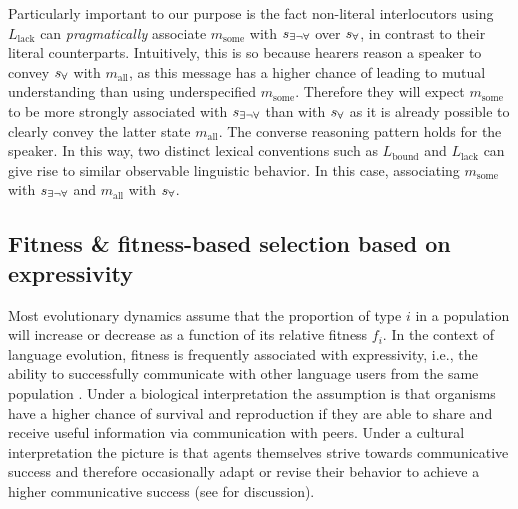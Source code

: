 \documentclass[a4paper, 11pt]{article}
\newcommand{\state}{\ensuremath{s}\xspace}		%
\newcommand{\mystate}[1]{\ensuremath{\state_{\text{#1}}}\xspace} %
\newcommand{\mylang}[1]{\ensuremath{L_{\text{#1}}}\xspace} %
\newcommand{\messg}{\ensuremath{m}\xspace}		%
\newcommand{\mymessg}[1]{\ensuremath{\messg_{\text{#1}}}\xspace} %
\newcommand{\ssome}{\mystate{\ensuremath{\exists\neg\forall}}}
\newcommand{\sall}{\mystate{\ensuremath{\forall}}}
\newcommand{\msome}{\mymessg{some}}
\newcommand{\mall}{\mymessg{all}}
\newcommand{\Lbound}{\mylang{bound}}
\newcommand{\Llack}{\mylang{lack}}
\begin{document}
Particularly important to our purpose is the fact non-literal interlocutors using $\Llack$ can {\em pragmatically} associate $\msome$ with $\ssome$ over $\sall$,  in contrast to their literal counterparts. Intuitively, this is so because hearers reason a speaker to convey $\sall$ with $\mall$, as this message has a higher chance of leading to mutual understanding than using underspecified $\msome$. Therefore they will expect $\msome$ to be more strongly associated with $\ssome$ than with $\sall$ as it is already possible to clearly convey the latter state $\mall$. The converse reasoning pattern holds for the speaker. In this way, two distinct lexical conventions such as $\Lbound$ and $\Llack$ can give rise to similar observable linguistic behavior. In this case, associating $\msome$ with $\ssome$ and $\mall$ with $\sall$.

\subsection{Fitness \& fitness-based selection based on expressivity}\label{sec:expressivity}

Most evolutionary dynamics assume that the proportion of type $i$ in a population will increase
or decrease as a function of its relative fitness $f_i$. In the context of language evolution,
fitness is frequently associated with expressivity, i.e., the ability to successfully
communicate with other language users from the same population
\citep[e.g.,][]{nowak+krakauer:1999,nowak+etal:2000, nowak+etal:2002}. Under a biological
interpretation the assumption is that organisms have a higher chance of survival and
reproduction if they are able to share and receive useful information via communication with
peers. Under a cultural interpretation the picture is that agents themselves strive towards
communicative success and therefore occasionally adapt or revise their behavior to achieve a
higher communicative success (see \citealt[\S3.3]{benz+etal:2005b} for discussion).
\end{document}
